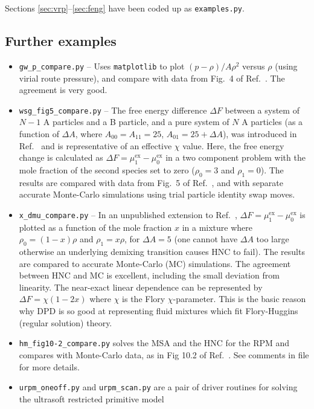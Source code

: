 \documentclass[12pt,a4paper]{article}
\newcommand{\myex}{^{\mathrm{ex}}}
\newcommand{\muex}{\mu\myex}
\newcommand{\Refcite}[1]{Ref.~\cite{#1}}
\begin{document}
Sections \ref{sec:vrp}--\ref{sec:feng} have been coded up as
\verb+examples.py+. 

\subsection{Further examples}

\begin{itemize}
%
\item\verb+gw_p_compare.py+ -- Uses \verb+matplotlib+ to plot
  $(p-\rho) /A\rho^2$ versus $\rho$ (using virial route pressure), and
  compare with data from Fig.~4 of \Refcite{GW97}.  The agreement is
  very good.
%
\item\verb+wsg_fig5_compare.py+ -- The free energy difference $\Delta
  F$ between a system of $N-1$ A particles and a B particle, and a
  pure system of $N$ A particles (as a function of $\Delta A$, where
  $A_{00}=A_{11}=25$, $A_{01}=25+\Delta A$), was introduced in
  \Refcite{WSG01} and is representative of an effective $\chi$ value.
  Here, the free energy change is calculated as $\Delta
  F=\muex_1-\muex_0$ in a two component problem with the mole fraction
  of the second species set to zero ($\rho_0=3$ and $\rho_1=0$).  The
  results are compared with data from Fig.~5 of \Refcite{WSG01}, and
  with separate accurate Monte-Carlo simulations using trial particle
  identity swap moves. 
%
\item\verb+x_dmu_compare.py+ -- In an unpublished extension to
  \Refcite{WSG01}, $\Delta F=\muex_1-\muex_0$ is plotted as a function
  of the mole fraction $x$ in a mixture where $\rho_0=(1-x)\rho$ and
  $\rho_1=x\rho$, for $\Delta A=5$ (one cannot have $\Delta A$ too
  large otherwise an underlying demixing transition causes HNC to
  fail).  The results are compared to accurate Monte-Carlo (MC)
  simulations.  The agreement between HNC and MC is excellent,
  including the small deviation from linearity.  The near-exact linear
  dependence can be represented by $\Delta F = \chi (1 - 2x)$ where
  $\chi$ is the Flory $\chi$-parameter.  This is the basic reason why
  DPD is so good at representing fluid mixtures which fit
  Flory-Huggins (regular solution) theory.
%
\item\verb+hm_fig10-2_compare.py+ solves the MSA and the HNC for the
  RPM and compares with Monte-Carlo data, as in Fig 10.2 of
  \Refcite{HM06}.  See comments in file for more details.
%
\item\verb+urpm_oneoff.py+ and \verb+urpm_scan.py+ are a pair of
  driver routines for solving the ultrasoft restricted primitive model

\end{itemize}
\end{document}
